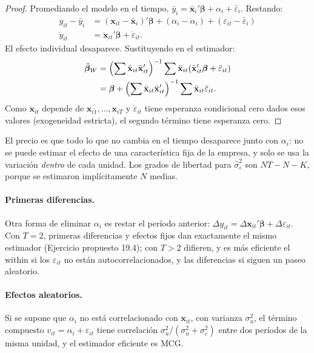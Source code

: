 \begin{proof}
Promediando el modelo en el tiempo, $\bar y_i=\bar{\mathbf x}_i'\boldsymbol\beta+\alpha_i+\bar\varepsilon_i$. Restando:
\begin{align*}
  y_{it}-\bar y_i &= (\mathbf x_{it}-\bar{\mathbf x}_i)'\boldsymbol\beta+(\alpha_i-\alpha_i)+(\varepsilon_{it}-\bar\varepsilon_i)\\
  \ddot y_{it} &= \ddot{\mathbf x}_{it}'\boldsymbol\beta+\ddot\varepsilon_{it} .
\end{align*}
El efecto individual desaparece. Sustituyendo en el estimador:
\begin{align*}
  \hat{\boldsymbol\beta}_W &= \Bigl(\sum\ddot{\mathbf x}_{it}\ddot{\mathbf x}_{it}'\Bigr)^{-1}\sum\ddot{\mathbf x}_{it}(\ddot{\mathbf x}_{it}'\boldsymbol\beta+\ddot\varepsilon_{it})\\
                           &= \boldsymbol\beta+\Bigl(\sum\ddot{\mathbf x}_{it}\ddot{\mathbf x}_{it}'\Bigr)^{-1}\sum\ddot{\mathbf x}_{it}\ddot\varepsilon_{it}.
\end{align*}
Como $\ddot{\mathbf x}_{it}$ depende de $\mathbf x_{i1},\dots,\mathbf x_{iT}$ y $\ddot\varepsilon_{it}$ tiene esperanza condicional
cero dados esos valores (exogeneidad estricta), el segundo término tiene esperanza cero.
\end{proof}

El precio es que todo lo que no cambia en el tiempo desaparece junto con $\alpha_i$: no se puede estimar el efecto de una
característica fija de la empresa, y solo se usa la variación \emph{dentro} de cada unidad. Los grados de libertad para
$\hat\sigma^2_\varepsilon$ son $NT-N-K$, porque se estimaron implícitamente $N$ medias.

\paragraph{Primeras diferencias.} Otra forma de eliminar $\alpha_i$ es restar el período anterior:
$\Delta y_{it}=\Delta\mathbf x_{it}'\boldsymbol\beta+\Delta\varepsilon_{it}$. Con $T=2$, primeras diferencias y efectos fijos dan
exactamente el mismo estimador (Ejercicio propuesto 19.4); con $T>2$ difieren, y es más eficiente el within si los
$\varepsilon_{it}$ no están autocorrelacionados, y las diferencias si siguen un paseo aleatorio.

\paragraph{Efectos aleatorios.} Si se supone que $\alpha_i$ no está correlacionado con $\mathbf x_{it}$, con varianza
$\sigma_u^2$, el término compuesto $v_{it}=\alpha_i+\varepsilon_{it}$ tiene correlación $\sigma_u^2/(\sigma_u^2+\sigma_\varepsilon^2)$
entre dos períodos de la misma unidad, y el estimador eficiente es MCG.

